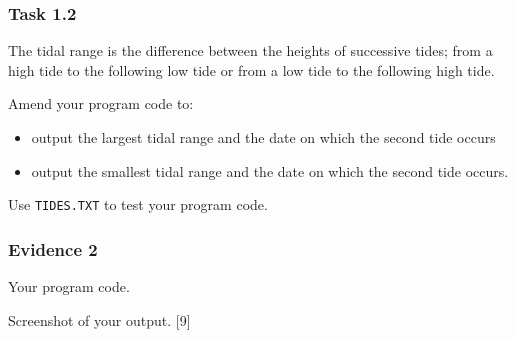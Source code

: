 \subsubsection*{Task 1.2}

The tidal range is the difference between the heights of successive
tides; from a high tide to the following low tide or from a low tide
to the following high tide.

Amend your program code to:
\begin{itemize}
\item output the largest tidal range and the date on which the second tide
occurs
\item output the smallest tidal range and the date on which the second tide
occurs.
\end{itemize}
Use \texttt{TIDES.TXT} to test your program code.

\subsubsection*{Evidence 2}

Your program code.

Screenshot of your output. \hfill{}{[}9{]}